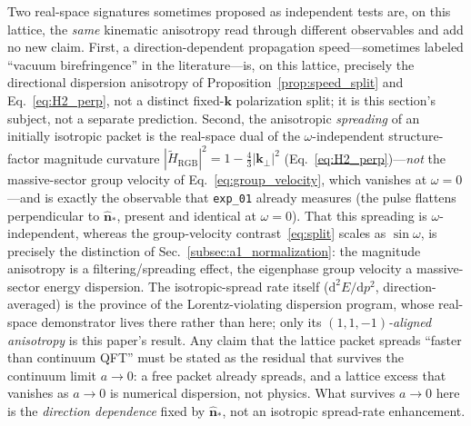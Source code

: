 \begin{remark}
\label{rem:spreading_same_channel}
Two real-space signatures sometimes proposed as independent tests are, on
this lattice, the \emph{same} kinematic anisotropy read through different
observables and add no new claim. First, a direction-dependent propagation
speed---sometimes labeled ``vacuum birefringence'' in the literature---is, on
this lattice, precisely the directional dispersion anisotropy of
Proposition~\ref{prop:speed_split} and Eq.~\eqref{eq:H2_perp}, not a distinct
fixed-$\mathbf{k}$ polarization split; it is this section's subject, not a
separate prediction. Second, the anisotropic \emph{spreading} of an initially
isotropic packet is the real-space dual of the $\omega$-independent
structure-factor magnitude curvature $|\tilde H_\text{RGB}|^2 = 1 -
\tfrac43|\mathbf{k}_\perp|^2$ (Eq.~\eqref{eq:H2_perp})---\emph{not} the
massive-sector group velocity of Eq.~\eqref{eq:group_velocity}, which vanishes at
$\omega=0$---and is exactly the observable that \texttt{exp\_01} already measures
(the pulse flattens perpendicular to $\hat{\mathbf{n}}_*$, present and identical at
$\omega=0$). That this spreading is $\omega$-independent, whereas the group-velocity
contrast~\eqref{eq:split} scales as $\sin\omega$, is precisely the distinction of
Sec.~\ref{subsec:a1_normalization}: the magnitude anisotropy is a filtering/spreading
effect, the eigenphase group velocity a massive-sector energy dispersion. The isotropic-spread rate itself
($\mathrm{d}^2E/\mathrm{d}p^2$, direction-averaged) is the province of the
Lorentz-violating dispersion program, whose real-space demonstrator lives
there rather than here; only its \emph{$(1,1,-1)$-aligned anisotropy} is
this paper's result. Any claim that the lattice packet spreads ``faster than
continuum QFT'' must be stated as the residual that survives the continuum
limit $a\to0$: a free packet already spreads, and a lattice excess that
vanishes as $a\to0$ is numerical dispersion, not physics. What survives
$a\to0$ here is the \emph{direction dependence} fixed by
$\hat{\mathbf{n}}_*$, not an isotropic spread-rate enhancement.
\end{remark}
